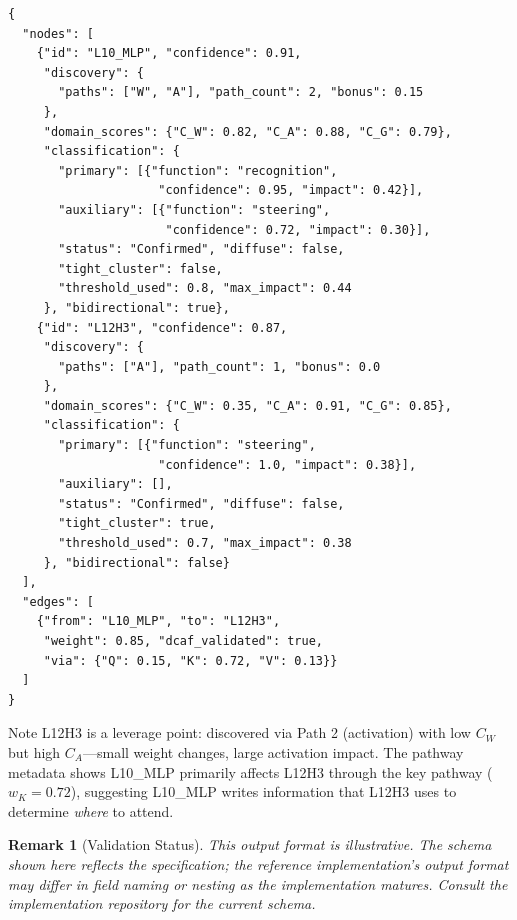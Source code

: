 \documentclass[11pt]{article}
\newtheorem{remark}{Remark}[section]
\begin{document}
\begin{verbatim}
{
  "nodes": [
    {"id": "L10_MLP", "confidence": 0.91,
     "discovery": {
       "paths": ["W", "A"], "path_count": 2, "bonus": 0.15
     },
     "domain_scores": {"C_W": 0.82, "C_A": 0.88, "C_G": 0.79},
     "classification": {
       "primary": [{"function": "recognition",
                     "confidence": 0.95, "impact": 0.42}],
       "auxiliary": [{"function": "steering",
                      "confidence": 0.72, "impact": 0.30}],
       "status": "Confirmed", "diffuse": false,
       "tight_cluster": false,
       "threshold_used": 0.8, "max_impact": 0.44
     }, "bidirectional": true},
    {"id": "L12H3", "confidence": 0.87,
     "discovery": {
       "paths": ["A"], "path_count": 1, "bonus": 0.0
     },
     "domain_scores": {"C_W": 0.35, "C_A": 0.91, "C_G": 0.85},
     "classification": {
       "primary": [{"function": "steering",
                     "confidence": 1.0, "impact": 0.38}],
       "auxiliary": [],
       "status": "Confirmed", "diffuse": false,
       "tight_cluster": true,
       "threshold_used": 0.7, "max_impact": 0.38
     }, "bidirectional": false}
  ],
  "edges": [
    {"from": "L10_MLP", "to": "L12H3",
     "weight": 0.85, "dcaf_validated": true,
     "via": {"Q": 0.15, "K": 0.72, "V": 0.13}}
  ]
}
\end{verbatim}

Note L12H3 is a leverage point: discovered via Path 2 (activation) with low $C_W$ but high $C_A$---small weight changes, large activation impact. The pathway metadata shows L10\_MLP primarily affects L12H3 through the key pathway ($w_K = 0.72$), suggesting L10\_MLP writes information that L12H3 uses to determine \emph{where} to attend.

\begin{remark}[Validation Status]
\label{rem:output-format-validation-status}
This output format is illustrative. The schema shown here reflects the specification; the reference implementation's output format may differ in field naming or nesting as the implementation matures. Consult the implementation repository for the current schema.
\end{remark}
\end{document}
